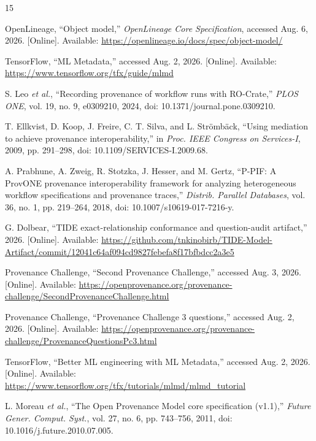 \documentclass[conference]{IEEEtran}
\theoremstyle{tideproposition}
\begin{document}
\begin{thebibliography}{15}
\setlength{\itemsep}{0pt}
\setlength{\parskip}{0pt}

OpenLineage, ``Object model,'' \emph{OpenLineage Core Specification}, accessed Aug. 6, 2026. [Online]. Available: \url{https://openlineage.io/docs/spec/object-model/}

TensorFlow, ``ML Metadata,'' accessed Aug. 2, 2026. [Online]. Available: \url{https://www.tensorflow.org/tfx/guide/mlmd}

S. Leo \emph{et al.}, ``Recording provenance of workflow runs with RO-Crate,''
\emph{PLOS ONE}, vol. 19, no. 9, e0309210, 2024, doi: 10.1371/journal.pone.0309210.

T. Ellkvist, D. Koop, J. Freire, C. T. Silva, and L. Str\"omb\"ack,
``Using mediation to achieve provenance interoperability,''
in \emph{Proc. IEEE Congress on Services-I}, 2009, pp. 291--298, doi: 10.1109/SERVICES-I.2009.68.

A. Prabhune, A. Zweig, R. Stotzka, J. Hesser, and M. Gertz,
``P-PIF: A ProvONE provenance interoperability framework for analyzing heterogeneous workflow specifications and provenance traces,''
\emph{Distrib. Parallel Databases}, vol. 36, no. 1, pp. 219--264, 2018, doi: 10.1007/s10619-017-7216-y.

    G. Dolbear, ``TIDE exact-relationship conformance and question-audit artifact,'' 2026. [Online]. Available: \url{https://github.com/tnkinobirb/TIDE-Model-Artifact/commit/12041c64af094cd9827febefa8f17bfbdcc2a3e5}

Provenance Challenge, ``Second Provenance Challenge,'' accessed Aug. 3, 2026. [Online]. Available: \url{https://openprovenance.org/provenance-challenge/SecondProvenanceChallenge.html}

Provenance Challenge, ``Provenance Challenge 3 questions,'' accessed Aug. 2, 2026. [Online]. Available: \url{https://openprovenance.org/provenance-challenge/ProvenanceQuestionsPc3.html}

TensorFlow, ``Better ML engineering with ML Metadata,'' accessed Aug. 2, 2026. [Online]. Available: \url{https://www.tensorflow.org/tfx/tutorials/mlmd/mlmd_tutorial}

L. Moreau \emph{et al.}, ``The Open Provenance Model core specification (v1.1),''
\emph{Future Gener. Comput. Syst.}, vol. 27, no. 6, pp. 743--756, 2011, doi: 10.1016/j.future.2010.07.005.


\end{thebibliography}
\end{document}
